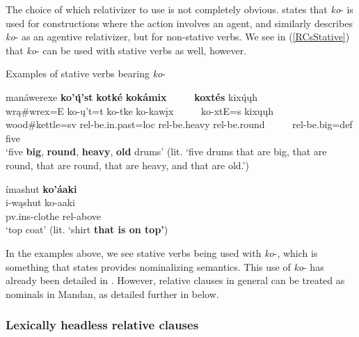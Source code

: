 The choice of which relativizer to use is not completely obvious. \citet[15]{kennard1936} states that \textit{ko}- is used for constructions where the action involves an agent, and \citet[451]{hollow1970} similarly describes \textit{ko}- as an agentive relativizer, but for non-stative verbs. We see in (\ref{RCsStative}) that \textit{ko}- can be used with stative verbs as well, however.

\begin{exe}
    \item\label{RCsStative} Examples of stative verbs bearing \textit{ko}-

    \begin{xlist}
    \item\label{RCsStativeA} \glll manáwerexe \textbf{ko'ų́'st} \textbf{kotké} \textbf{kokámix} ~ ~ ~ \textbf{koxtés} kixų́ųh\\
        wrą\#wrex=E ko-ų't=t ko-tke ko-kawįx ~ ~ ~ ko-xtE=s {kixųųh}\\
        \textnormal{wood}\#\textnormal{kettle}=sv rel-\textnormal{be.in.past}=loc rel-\textnormal{be.heavy} rel-\textnormal{be.round} ~ ~ ~ rel-\textnormal{be.big}=def \textnormal{five}\\
        \glt `{five} \textbf{big}, \textbf{round}, \textbf{heavy}, \textbf{old} drums' (lit. `five drums that are big, that are round, that are round, that are heavy, and that are old.') \citep[21]{mixco1997a}

        \item\label{RCsStativeB} \glll ímashut \textbf{ko'áaki}\\
        i-wąshut ko-aaki\\
        pv.ins-\textnormal{clothe} rel-\textnormal{above}\\
        \glt `top coat' (lit. `shirt \textbf{that is on top'}) \citep[56]{hollow1970}
    \end{xlist}
\end{exe}

In the examples above, we see stative verbs being used with \textit{ko}-, which is something that \citet[451]{hollow1970} states provides nominalizing semantics. This use of \textit{ko}- has already been detailed in . However, relative clauses in general can be treated as nominals in Mandan, as detailed further in  below.

\subsubsection{Lexically headless relative clauses}\label{Ch5HeadlessRCs}

